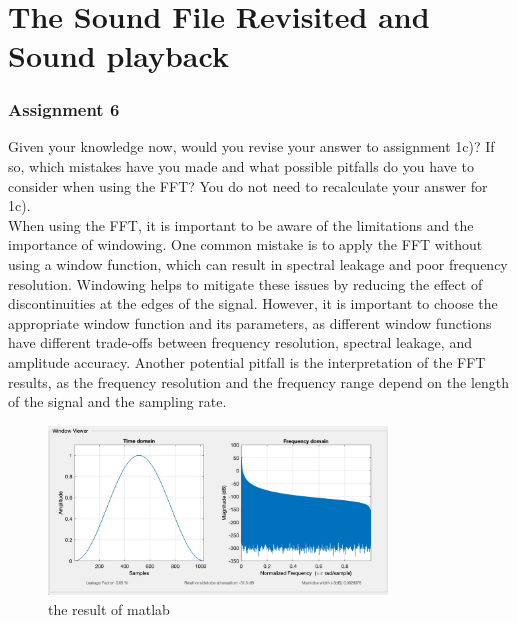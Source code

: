 \documentclass[
	a4paper,
	11pt,
]{article}
\begin{document}
\\
\section{The Sound File Revisited and Sound playback}


\subsubsection{Assignment 6}
Given your knowledge now, would you revise your answer to assignment 1c)? If so, which mistakes have you made and what possible pitfalls do you have to consider when using the FFT? You do not need to recalculate your answer for 1c).\\

When using the FFT, it is important to be aware of the limitations and the importance of windowing. One common mistake is to apply the FFT without using a window function, which can result in spectral leakage and poor frequency resolution. Windowing helps to mitigate these issues by reducing the effect of discontinuities at the edges of the signal. However, it is important to choose the appropriate window function and its parameters, as different window functions have different trade-offs between frequency resolution, spectral leakage, and amplitude accuracy. Another potential pitfall is the interpretation of the FFT results, as the frequency resolution and the frequency range depend on the length of the signal and the sampling rate.
\\
\begin{figure}[htb!]
    \centerline{\includegraphics[width=9cm]{A67/a6.jpg}}
    \caption{the result of matlab}
\end{figure}
\end{document}
